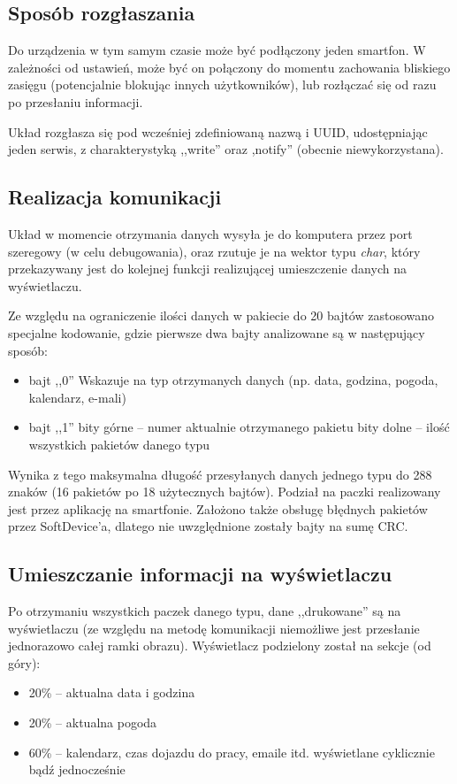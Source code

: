 \documentclass[a4paper,11pt]{article}
\begin{document}
\subsection{Sposób rozgłaszania}
Do urządzenia w tym samym czasie może być podłączony jeden smartfon. W zależności od ustawień, 
 może być on połączony do momentu zachowania bliskiego zasięgu (potencjalnie blokując innych użytkowników),  lub rozłączać się od razu po przesłaniu informacji. 

Układ rozgłasza się pod wcześniej zdefiniowaną nazwą i UUID, udostępniając jeden serwis, z charakterystyką ,,write'' oraz ,notify'' (obecnie niewykorzystana).

\subsection{Realizacja komunikacji}
Układ w momencie otrzymania danych wysyła je do komputera przez port szeregowy (w celu debugowania), oraz rzutuje je na wektor typu \textit{char}, który przekazywany jest do kolejnej funkcji realizującej umieszczenie danych na wyświetlaczu.

Ze względu na ograniczenie ilości danych w pakiecie do 20 bajtów zastosowano specjalne kodowanie, gdzie pierwsze dwa bajty analizowane są w następujący sposób: 
\begin{itemize}
	\item bajt ,,0''
	\subitem Wskazuje na typ otrzymanych danych (np. data, godzina, pogoda, kalendarz, e-mali) 
	\item bajt ,,1''
	 bity górne -- numer aktualnie otrzymanego pakietu
	 bity dolne -- ilość wszystkich pakietów danego typu
\end{itemize}
Wynika z tego maksymalna długość przesyłanych danych jednego typu do 288 znaków (16 pakietów po 18 użytecznych bajtów). Podział na paczki realizowany jest przez aplikację na smartfonie. Założono także obsługę błędnych pakietów przez SoftDevice'a, dlatego nie uwzględnione zostały bajty na sumę CRC.

\subsection{Umieszczanie informacji na wyświetlaczu}
Po otrzymaniu wszystkich paczek danego typu, dane ,,drukowane'' są na wyświetlaczu (ze względu na metodę komunikacji niemożliwe jest przesłanie jednorazowo całej ramki obrazu). Wyświetlacz podzielony został na sekcje (od góry):
\begin{itemize}
	\item 20\% -- aktualna data i godzina
	\item 20\% -- aktualna pogoda
	\item 60\% -- kalendarz, czas dojazdu do pracy, emaile itd. wyświetlane cyklicznie bądź jednocześnie
\end{itemize}
\end{document}
